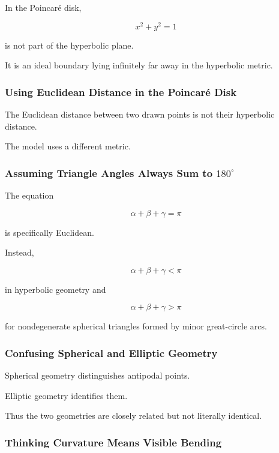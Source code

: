 In the Poincar\'e disk,

\[
x^2+y^2=1
\]

is not part of the hyperbolic plane.

It is an ideal boundary lying infinitely far away in the hyperbolic metric.

\subsubsection{Using Euclidean Distance in the Poincar\'e Disk}

The Euclidean distance between two drawn points is not their hyperbolic
distance.

The model uses a different metric.

\subsubsection{Assuming Triangle Angles Always Sum to \(180^\circ\)}

The equation

\[
\alpha+\beta+\gamma=\pi
\]

is specifically Euclidean.

Instead,

\[
\alpha+\beta+\gamma<\pi
\]

in hyperbolic geometry and

\[
\alpha+\beta+\gamma>\pi
\]

for nondegenerate spherical triangles formed by minor great-circle arcs.

\subsubsection{Confusing Spherical and Elliptic Geometry}

Spherical geometry distinguishes antipodal points.

Elliptic geometry identifies them.

Thus the two geometries are closely related but not literally identical.

\subsubsection{Thinking Curvature Means Visible Bending}

